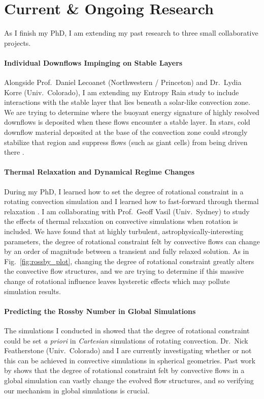 \documentclass[preprint, hmargin=1in, vmargin=1in]{aastex62}
\begin{document}
\vspace{-44pt}
\section*{\textbf{Current \& Ongoing Research}}
As I finish my PhD, I am extending my past research to three small collaborative projects.

\vspace{-4pt}
\paragraph{Individual Downflows Impinging on Stable Layers}
Alongside Prof.~Daniel Lecoanet (Northwestern / Princeton) and Dr.~Lydia Korre (Univ.~Colorado), I am extending my Entropy Rain study to include interactions with the stable layer that lies beneath a solar-like convection zone.
We are trying to determine where the buoyant energy signature of highly resolved downflows is deposited when these flows encounter a stable layer.
In stars, cold downflow material deposited at the base of the convection zone could strongly stabilize that region and suppress flows (such as giant cells) from being driven there \citep{cossette&rast2016}.

\vspace{-4pt}
\paragraph{Thermal Relaxation and Dynamical Regime Changes}
During my PhD, I learned how to set the degree of rotational constraint in a rotating convection simulation \citep{anders&all2019} and I learned how to fast-forward through thermal relaxation \citep{anders&all2018}.
I am collaborating with Prof.~Geoff Vasil (Univ.~Sydney) to study the effects of thermal relaxation on convective simulations when rotation is included.
We have found that at highly turbulent, astrophysically-interesting parameters, the degree of rotational constraint felt by convective flows can change by an order of magnitude between a transient and fully relaxed solution.
As in Fig.~\ref{fig:rossby_plot}, changing the degree of rotational constraint greatly alters the convective flow structures, and we are trying to determine if this massive change of rotational influence leaves hysteretic effects which may pollute simulation results.

\vspace{-4pt}
\paragraph{Predicting the Rossby Number in Global Simulations}
The simulations I conducted in \citet{anders&all2019} showed that the degree of rotational constraint could be set \emph{a priori} in \emph{Cartesian} simulations of rotating convection.
Dr.~Nick Featherstone (Univ.~Colorado) and I are currently investigating whether or not this can be achieved in convective simulations in spherical geometries.
Past work by \citet{featherstone&hindman2016} shows that the degree of rotational constraint felt by convective flows in a global simulation can vastly change the evolved flow structures, and so verifying our mechanism in global simulations is crucial.




\end{document}
